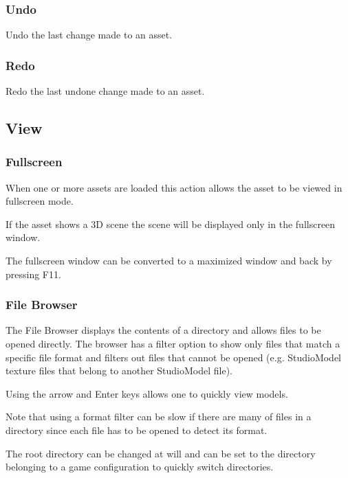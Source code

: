\documentclass[10pt, a4paper, titlepage, oneside]{article}
\begin{document}
\subsubsection{Undo}

Undo the last change made to an asset.

\subsubsection{Redo}

Redo the last undone change made to an asset.

\subsection{View}

\subsubsection{Fullscreen}

When one or more assets are loaded this action allows the asset to be viewed in fullscreen mode.

If the asset shows a 3D scene the scene will be displayed only in the fullscreen window.

The fullscreen window can be converted to a maximized window and back by pressing F11.

\subsubsection{File Browser}

The File Browser displays the contents of a directory and allows files to be opened directly.
The browser has a filter option to show only files that match a specific file format and filters out files that cannot be opened (e.g. StudioModel texture files that belong to another StudioModel file).

Using the arrow and Enter keys allows one to quickly view models.

\vspace{\baselineskip}
Note that using a format filter can be slow if there are many of files in a directory since each file has to be opened to detect its format.

\vspace{\baselineskip}
The root directory can be changed at will and can be set to the directory belonging to a game configuration to quickly switch directories.
\end{document}
